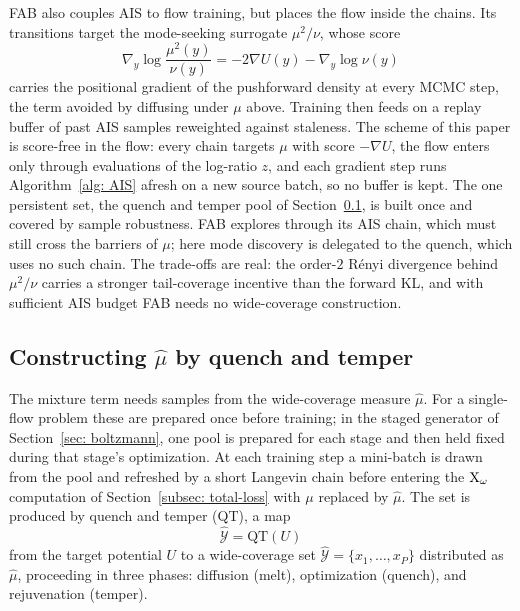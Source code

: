 \documentclass{article}
\begin{document}
\begin{remark}
\label{rem: fab}
FAB \citep{midgley2022flow} also couples AIS to flow training, but places the flow inside the chains. Its transitions target the mode-seeking surrogate $\mu^2/\nu$, whose score
\begin{equation*}
    \nabla_y \log \frac{\mu^2(y)}{\nu(y)} = -2\nabla U(y) - \nabla_y \log\nu(y)
\end{equation*}
carries the positional gradient of the pushforward density at every MCMC step, the term avoided by diffusing under $\mu$ above. Training then feeds on a replay buffer of past AIS samples reweighted against staleness. The scheme of this paper is score-free in the flow: every chain targets $\mu$ with score $-\nabla U$, the flow enters only through evaluations of the log-ratio $z$, and each gradient step runs Algorithm~\ref{alg: AIS} afresh on a new source batch, so no buffer is kept. The one persistent set, the quench and temper pool of Section~\ref{subsec: QT}, is built once and covered by sample robustness. FAB explores through its AIS chain, which must still cross the barriers of $\mu$; here mode discovery is delegated to the quench, which uses no such chain. The trade-offs are real: the order-$2$ Rényi divergence behind $\mu^2/\nu$ carries a stronger tail-coverage incentive than the forward KL, and with sufficient AIS budget FAB needs no wide-coverage construction.
\end{remark}

\subsection{Constructing $\hat\mu$ by quench and temper}
\label{subsec: QT}

The mixture term needs samples from the wide-coverage measure $\hat\mu$. For a single-flow problem these are prepared once before training; in the staged generator of Section~\ref{sec: boltzmann}, one pool is prepared for each stage and then held fixed during that stage's optimization. At each training step a mini-batch is drawn from the pool and refreshed by a short Langevin chain before entering the $\mathrm{X}_\omega$ computation of Section~\ref{subsec: total-loss} with $\mu$ replaced by $\hat\mu$. The set is produced by quench and temper (QT), a map
\begin{equation*}
    \hat{\mathcal Y} = \mathrm{QT}(U)
\end{equation*}
from the target potential $U$ to a wide-coverage set $\hat{\mathcal Y} = \{x_1,\dots,x_P\}$ distributed as $\hat\mu$, proceeding in three phases: diffusion (melt), optimization (quench), and rejuvenation (temper).
\end{document}
